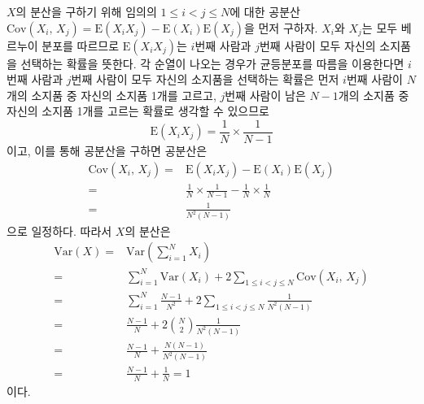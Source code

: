 \begin{itemize}
{		$X$의 분산을 구하기 위해 임의의 $1 \leq i < j \leq N$에 대한 공분산 $\mathrm{Cov}\left(X_i,\,X_j\right) = \mathrm{E}\left(X_i X_j\right) - \mathrm{E}\left(X_i\right)\mathrm{E}\left(X_j\right)$을 먼저 구하자.
		$X_i$와 $X_j$는 모두 베르누이 분포를 따르므로 $\mathrm{E}\left(X_i X_j\right)$는 $i$번째 사람과 $j$번째 사람이 모두 자신의 소지품을 선택하는 확률을 뜻한다.
		각 순열이 나오는 경우가 균등분포를 따름을 이용한다면 $i$번째 사람과 $j$번째 사람이 모두 자신의 소지품을 선택하는 확률은 먼저 $i$번째 사람이 $N$개의 소지품 중 자신의 소지품 1개를 고르고, $j$번째
		사람이 남은 $N - 1$개의 소지품 중 자신의 소지품 1개를 고르는 확률로 생각할 수 있으므로
		\[\mathrm{E}\left(X_i X_j\right) = \frac{1}{N} \times \frac{1}{N - 1}\]
		이고, 이를 통해 공분산을 구하면 공분산은
		\begin{align*}
			\mathrm{Cov}\left(X_i,\,X_j\right) =& \mathrm{E}\left(X_i X_j\right) - \mathrm{E}\left(X_i\right)\mathrm{E}\left(X_j\right) \\
			=& \frac{1}{N} \times \frac{1}{N - 1} - \frac{1}{N} \times \frac{1}{N} \\
			=& \frac{1}{N^2\left(N - 1\right)}
		\end{align*}
		으로 일정하다. 따라서 $X$의 분산은
		\begin{align*}
			\mathrm{Var}\left(X\right) =& \mathrm{Var}\left(\sum_{i = 1}^{N} X_i\right) \\
			=& \sum_{i = 1}^{N}\mathrm{Var}\left(X_i\right) + 2\sum_{1 \leq i < j \leq N}\mathrm{Cov}\left(X_i,\,X_j\right) \\
			=& \sum_{i = 1}^{N}\frac{N - 1}{N^2} + 2\sum_{1 \leq i < j \leq N}\frac{1}{N^2\left(N - 1\right)} \\
			=& \frac{N - 1}{N} + 2\binom{N}{2}\frac{1}{N^2\left(N - 1\right)} \\
			=& \frac{N - 1}{N} + \frac{N\left(N - 1\right)}{N^2\left(N - 1\right)} \\
			=& \frac{N - 1}{N} + \frac{1}{N} = 1
		\end{align*}
		이다.
	}
\end{itemize}



